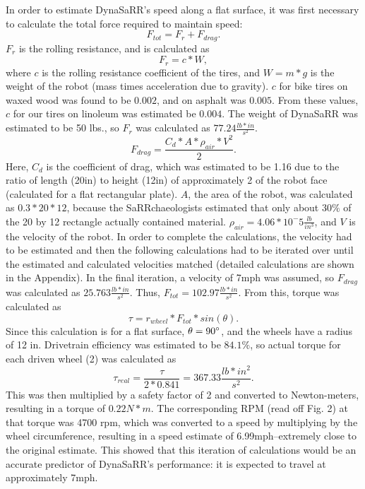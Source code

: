 \documentclass[12pt]{article}
\begin{document}
In order to estimate DynaSaRR's speed along a flat surface, it was first necessary to calculate the total force required to maintain speed:
$$F_{tot} = F_r + F_{drag}.$$
$F_r$ is the rolling resistance, and is calculated as $$F_r = c*W,$$ where $c$ is the rolling resistance coefficient of the tires, and $W = m*g$ is the weight of the robot (mass times acceleration due to gravity). $c$ for bike tires on waxed wood was found to be $0.002$, and on asphalt was $0.005$. From these values, $c$ for our tires on linoleum was estimated be $0.004$. The weight of DynaSaRR was estimated to be 50 lbs., so $F_r$ was calculated as $77.24 \frac{lb*in}{s^2}$.
$$ F_{drag} = \frac{C_d*A* \rho_{air}*V^2}{2}.$$
Here, $C_d$ is the coefficient of drag, which was estimated to be 1.16 due to the ratio of length (20in) to height (12in) of approximately 2 of the robot face (calculated for a flat rectangular plate). $A$, the area of the robot, was calculated as $0.3*20*12$, because the SaRRchaeologists estimated that only about $30 \%$ of the 20 by 12 rectangle actually contained material. $\rho_{air} = 4.06*10^-5 \frac{lb}{in^3}$, and $V$ is the velocity of the robot. In order to complete the calculations, the velocity had to be estimated and then the following calculations had to be iterated over until the estimated and calculated velocities matched (detailed calculations are shown in the Appendix). In the final iteration, a velocity of 7mph was assumed, so $F_{drag}$ was calculated as $25.763 \frac{lb*in}{s^2}$. Thus, $F_{tot} = 102.97 \frac{lb*in}{s^2}$. From this, torque was calculated as 
$$ \tau = r_{wheel}*F_{tot}*sin( \theta).$$
Since this calculation is for a flat surface, $\theta = 90 \degree $, and the wheels have a radius of 12 in. Drivetrain efficiency was estimated to be $84.1 \%$, so actual torque for each driven wheel (2) was calculated as
$$ \tau_{real} = \frac{\tau}{2*0.841} = 367.33 \frac{lb*in^2}{s^2}.$$
This was then multiplied by a safety factor of 2 and converted to Newton-meters, resulting in a torque of $0.22 N*m$. The corresponding RPM (read off Fig. 2) at that torque was 4700 rpm, which was converted to a speed by multiplying by the wheel circumference, resulting in a speed estimate of 6.99mph--extremely close to the original estimate. This showed that this iteration of calculations would be an accurate predictor of DynaSaRR's performance: it is expected to travel at approximately 7mph.
\end{document}
